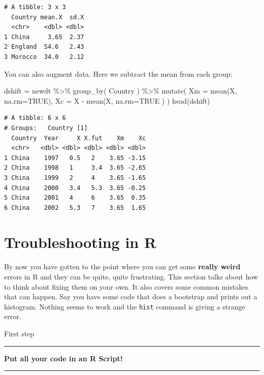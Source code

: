 \documentclass[
  letterpaper,
  DIV=11,
  numbers=noendperiod]{scrreprt}
\newenvironment{Shaded}{\begin{snugshade}}{\end{snugshade}}
\newcommand{\AttributeTok}[1]{\textcolor[rgb]{0.49,0.56,0.16}{#1}}
\newcommand{\ConstantTok}[1]{\textcolor[rgb]{0.53,0.00,0.00}{#1}}
\newcommand{\FunctionTok}[1]{\textcolor[rgb]{0.02,0.16,0.49}{#1}}
\newcommand{\NormalTok}[1]{\textcolor[rgb]{0.00,0.44,0.13}{#1}}
\newcommand{\OtherTok}[1]{\textcolor[rgb]{0.00,0.44,0.13}{#1}}
\newcommand{\SpecialCharTok}[1]{\textcolor[rgb]{0.25,0.44,0.63}{#1}}
\begin{document}
\begin{verbatim}
# A tibble: 3 x 3
  Country mean.X  sd.X
  <chr>    <dbl> <dbl>
1 China     3.65  2.37
2 England  54.6   2.43
3 Morocco  34.0   2.12
\end{verbatim}

You can also augment data. Here we subtract the mean from each group:

\begin{Shaded}
\begin{Highlighting}[]
\NormalTok{dshift }\OtherTok{=}\NormalTok{ newdt }\SpecialCharTok{\%\textgreater{}\%} \FunctionTok{group\_by}\NormalTok{( Country ) }\SpecialCharTok{\%\textgreater{}\%}
    \FunctionTok{mutate}\NormalTok{( }\AttributeTok{Xm =} \FunctionTok{mean}\NormalTok{(X, }\AttributeTok{na.rm=}\ConstantTok{TRUE}\NormalTok{),}
            \AttributeTok{Xc =}\NormalTok{ X }\SpecialCharTok{{-}} \FunctionTok{mean}\NormalTok{(X, }\AttributeTok{na.rm=}\ConstantTok{TRUE}\NormalTok{ ) )}
\FunctionTok{head}\NormalTok{(dshift)}
\end{Highlighting}
\end{Shaded}

\begin{verbatim}
# A tibble: 6 x 6
# Groups:   Country [1]
  Country  Year     X X.fut    Xm    Xc
  <chr>   <dbl> <dbl> <dbl> <dbl> <dbl>
1 China    1997   0.5   2    3.65 -3.15
2 China    1998   1     3.4  3.65 -2.65
3 China    1999   2     4    3.65 -1.65
4 China    2000   3.4   5.3  3.65 -0.25
5 China    2001   4     6    3.65  0.35
6 China    2002   5.3   7    3.65  1.65
\end{verbatim}

\hypertarget{troubleshooting-in-r}{%
\section{Troubleshooting in R}\label{troubleshooting-in-r}}

By now you have gotten to the point where you can get some
\textbf{really weird} errors in R and they can be quite, quite
frustrating. This section talks about how to think about fixing them on
your own. It also covers some common mistakes that can happen. Say you
have some code that does a bootstrap and prints out a histogram. Nothing
seems to work and the \texttt{hist} command is giving a strange error.

First step

\bgroup \vspace{5mm}
 \noindent\rule{1ex}{1ex}%
      \textbf{Put all your code in an R Script!}%
      \rule{1ex}{1ex}
      \vspace{5mm}
\egroup
\end{document}
